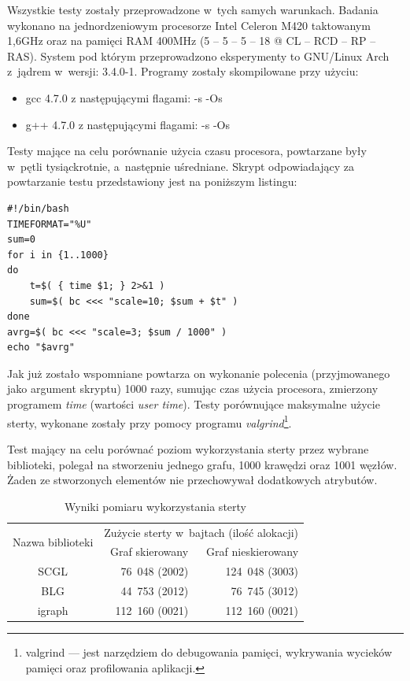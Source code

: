 \documentclass[a4paper,12pt,polish,twoside,openright]{thesis}
\begin{document}
Wszystkie testy zostały przeprowadzone w~tych samych warunkach.
Badania wykonano na jednordzeniowym procesorze Intel Celeron M420 taktowanym 1,6GHz oraz na pamięci RAM 400MHz (5 -- 5 -- 5 -- 18 @ CL -- RCD -- RP -- RAS).
System pod którym przeprowadzono eksperymenty to GNU/Linux Arch z~jądrem w~wersji: 3.4.0-1.
Programy zostały skompilowane przy użyciu:
\begin{itemize}
	\item gcc 4.7.0 z następującymi flagami: -s -Os
	\item g++ 4.7.0 z następującymi flagami: -s -Os
\end{itemize}

Testy mające na celu porównanie użycia czasu procesora, powtarzane były w~pętli tysiąckrotnie, a~następnie uśredniane.
Skrypt odpowiadający za powtarzanie testu przedstawiony jest na poniższym listingu:
\begin{lstlisting}[style=code,caption=Skrypt uśredniający czas wykonywania określonego określonego poleceniaa]
#!/bin/bash
TIMEFORMAT="%U"
sum=0
for i in {1..1000}
do
	t=$( { time $1; } 2>&1 )
	sum=$( bc <<< "scale=10; $sum + $t" )
done
avrg=$( bc <<< "scale=3; $sum / 1000" )
echo "$avrg"
\end{lstlisting}
Jak już zostało wspomniane powtarza on wykonanie polecenia (przyjmowanego jako argument skryptu) 1000 razy, sumując czas użycia procesora, zmierzony programem \emph{time} (wartości \emph{user time}).
Testy porównujące maksymalne użycie sterty, wykonane zostały przy pomocy programu \emph{valgrind}\footnote{valgrind --- jest narzędziem do debugowania pamięci, wykrywania wycieków pamięci oraz profilowania aplikacji.}.

Test mający na celu porównać poziom wykorzystania sterty przez wybrane biblioteki, polegał na stworzeniu jednego grafu, 1000 krawędzi oraz 1001 węzłów.
Żaden ze stworzonych elementów nie przechowywał dodatkowych atrybutów.
\begin{table}[htb]
\caption{Wyniki pomiaru wykorzystania sterty}
\label{tab:mem_size}
\centering
\begin{tabular}{ | c | r | r | }
	\hline
	\multirow{2}{*}{Nazwa biblioteki } & \multicolumn{2}{|c|}{Zużycie sterty w~bajtach (ilość alokacji)} \\
	\cline{2-3}
		& Graf skierowany & Graf nieskierowany \\
	\hline \hline
	SCGL    & 76~048  (2002) & 124~048 (3003) \\ \hline
	BLG     & 44~753  (2012) &  76~745 (3012) \\ \hline
	igraph  & 112~160 (0021) & 112~160 (0021) \\ \hline
\end{tabular}
\end{table}
\end{document}
